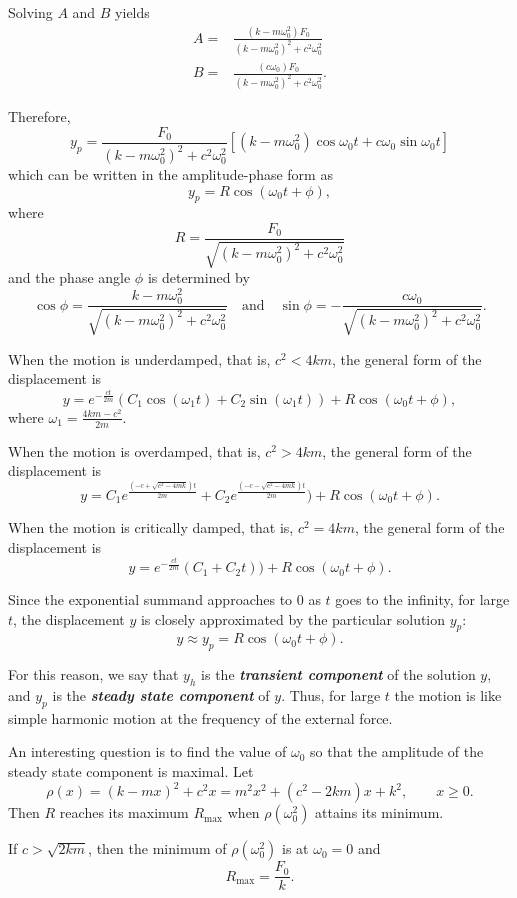 Solving $A$ and $B$ yields
\[
\begin{aligned}
  A=&\frac{(k-m\omega_0^2)F_0}{(k-m\omega_0^2)^2+c^2\omega_0^2}\\
  B=&\frac{(c\omega_0)F_0}{(k-m\omega_0^2)^2+c^2\omega_0^2}.
\end{aligned}
\]

Therefore,
\[
y_p=\frac{F_0}{(k-m\omega_0^2)^2+c^2\omega_0^2}\left[(k-m\omega_0^2)\cos\omega_0 t+c\omega_0\sin\omega_0 t\right]
\]
which can be written in the amplitude-phase form as
\[y_p=R\cos(\omega_0 t+\phi),\]
where 
\[R=\frac{F_0}{\sqrt{(k-m\omega_0^2)^2+c^2\omega_0^2}}\]
and the phase angle $\phi$ is determined by
\[\cos\phi=\frac{k-m\omega_0^2}{\sqrt{(k-m\omega_0^2)^2+c^2\omega_0^2}}\quad \text{and} \quad \sin\phi=-\frac{c\omega_0}{\sqrt{(k-m\omega_0^2)^2+c^2\omega_0^2}}.\]

When the motion is underdamped, that is,  $c^2<4km$, the general form of the displacement is
\[y=e^{-\frac{ct}{2m}}(C_1\cos(\omega_1t)+C_2\sin(\omega_1 t))+R\cos(\omega_0 t+\phi),\]
where $\omega_1=\frac{4km-c^2}{2m}$.

When the motion is overdamped, that is, $c^2>4km$, the general form of the displacement is
\[y=C_1e^{\frac{\left(-c+\sqrt{c^2-4mk}\right)t}{2m}}+C_2e^{\frac{\left(-c-\sqrt{c^2-4mk}\right)t}{2m}})+R\cos(\omega_0 t+\phi).\]

When the motion is critically damped, that is, $c^2=4km$, the general form of the displacement is
\[y=e^{-\frac{ct}{2m}}(C_1+C_2t)) + R\cos(\omega_0 t+\phi).\]

Since the exponential summand approaches to $0$ as $t$ goes to the infinity, for large $t$, the displacement $y$ is closely approximated by the particular solution $y_p$:
\[y\approx y_p=R\cos(\omega_0 t +\phi).\]

For this reason, we say that $y_h$ is the \emph{\textbf{transient component}} of the solution $y$, and $y_p$ is the \emph{\textbf{steady state component}} of $y$. Thus, for large $t$ the motion is like simple harmonic motion at the frequency of the external force.

An interesting question is to find the value of $\omega_0$ so that the amplitude of the steady state component is maximal. 
Let 
\[\rho(x)=(k-mx)^2+c^2x=m^2x^2+(c^2-2km)x+k^2,\qquad x\ge 0.\]
Then $R$ reaches its maximum $R_{\text{max}}$ when $\rho(\omega_0^2)$ attains its minimum.

If $c>\sqrt{2km}$, then the minimum of $\rho(\omega_0^2)$ is at $\omega_0=0$ and 
\[R_{\text{max}}=\frac{F_0}{k}.\]

